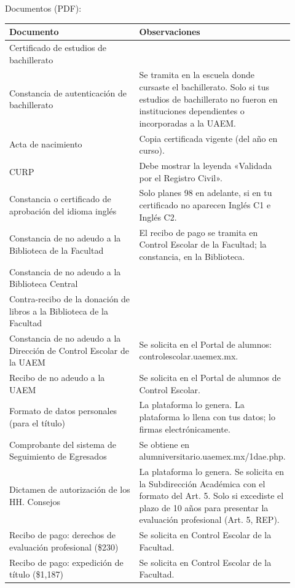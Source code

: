 Documentos (PDF):
{\small\begin{longtable}{>{\raggedright\arraybackslash}p{0.47\linewidth}>{\raggedright\arraybackslash}p{0.45\linewidth}}
\toprule
\textbf{Documento} & \textbf{Observaciones}\\
\midrule
\endhead
Certificado de estudios de bachillerato & \\
Constancia de autenticación de bachillerato & Se tramita en la escuela donde cursaste el bachillerato. Solo si tus estudios de bachillerato no fueron en instituciones dependientes o incorporadas a la UAEM.\\
Acta de nacimiento & Copia certificada vigente (del año en curso).\\
CURP & Debe mostrar la leyenda «Validada por el Registro Civil».\\
Constancia o certificado de aprobación del idioma inglés & Solo planes 98 en adelante, si en tu certificado no aparecen Inglés C1 e Inglés C2.\\
Constancia de no adeudo a la Biblioteca de la Facultad & El recibo de pago se tramita en Control Escolar de la Facultad; la constancia, en la Biblioteca.\\
Constancia de no adeudo a la Biblioteca Central & \\
Contra-recibo de la donación de libros a la Biblioteca de la Facultad & \\
Constancia de no adeudo a la Dirección de Control Escolar de la UAEM & Se solicita en el Portal de alumnos: controlescolar.uaemex.mx.\\
Recibo de no adeudo a la UAEM & Se solicita en el Portal de alumnos de Control Escolar.\\
Formato de datos personales (para el título) & La plataforma lo genera. La plataforma lo llena con tus datos; lo firmas electrónicamente.\\
Comprobante del sistema de Seguimiento de Egresados & Se obtiene en alumniversitario.uaemex.mx/1dae.php.\\
Dictamen de autorización de los HH. Consejos & La plataforma lo genera. Se solicita en la Subdirección Académica con el formato del Art. 5. Solo si excediste el plazo de 10 años para presentar la evaluación profesional (Art. 5, REP).\\
Recibo de pago: derechos de evaluación profesional (\$230) & Se solicita en Control Escolar de la Facultad.\\
Recibo de pago: expedición de título (\$1,187) & Se solicita en Control Escolar de la Facultad.\\
\bottomrule
\end{longtable}}
